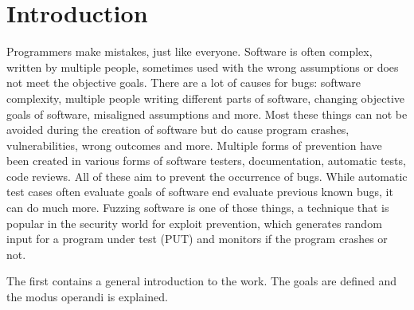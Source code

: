 \chapter{Introduction}
\label{cha:intro}
Programmers make mistakes, just like everyone.
Software is often complex, written by multiple people, sometimes used with the wrong assumptions or does not meet the objective goals. 
There are a lot of causes for bugs: software complexity, multiple people writing different parts of software, changing objective goals of software, misaligned assumptions and more. Most these things can not be avoided during the creation of software but do cause program crashes, vulnerabilities, wrong outcomes and more.
Multiple forms of prevention have been created in various forms of software testers, documentation, automatic tests, code reviews. All of these aim to prevent the occurrence of bugs. While automatic test cases often evaluate goals of software end evaluate previous known bugs, it can do much more.
Fuzzing software is one of those things, a technique that is popular in the security world for exploit prevention, which generates random input for a program under test (PUT) and monitors if the program crashes or not. 


The first contains a general introduction to the work. The goals are defined and the modus operandi is explained.

